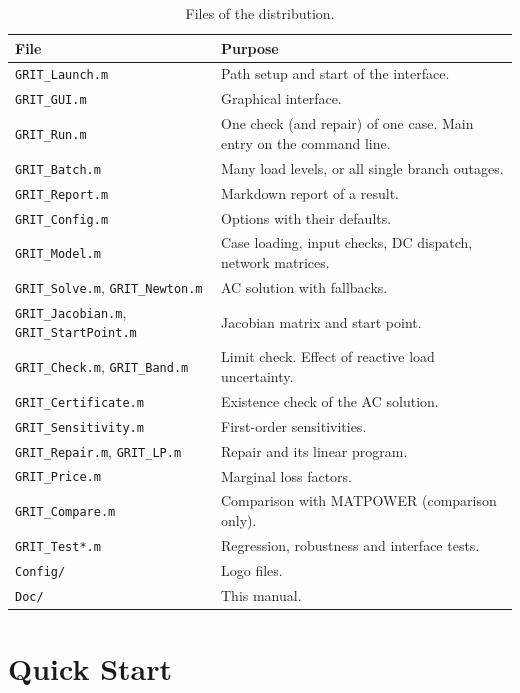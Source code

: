 \documentclass[a4paper,11pt]{article}
\begin{document}
\begin{table}[H]\centering\small
\begin{tabular}{@{}p{5.6cm}p{9.2cm}@{}}
\toprule
\textbf{File} & \textbf{Purpose} \\
\midrule
\texttt{GRIT\_Launch.m} & Path setup and start of the interface. \\
\texttt{GRIT\_GUI.m} & Graphical interface. \\
\texttt{GRIT\_Run.m} & One check (and repair) of one case. Main entry on the command line. \\
\texttt{GRIT\_Batch.m} & Many load levels, or all single branch outages. \\
\texttt{GRIT\_Report.m} & Markdown report of a result. \\
\texttt{GRIT\_Config.m} & Options with their defaults. \\
\texttt{GRIT\_Model.m} & Case loading, input checks, DC dispatch, network matrices. \\
\texttt{GRIT\_Solve.m}, \texttt{GRIT\_Newton.m} & AC solution with fallbacks. \\
\texttt{GRIT\_Jacobian.m}, \texttt{GRIT\_StartPoint.m} & Jacobian matrix and start point. \\
\texttt{GRIT\_Check.m}, \texttt{GRIT\_Band.m} & Limit check. Effect of reactive load uncertainty. \\
\texttt{GRIT\_Certificate.m} & Existence check of the AC solution. \\
\texttt{GRIT\_Sensitivity.m} & First-order sensitivities. \\
\texttt{GRIT\_Repair.m}, \texttt{GRIT\_LP.m} & Repair and its linear program. \\
\texttt{GRIT\_Price.m} & Marginal loss factors. \\
\texttt{GRIT\_Compare.m} & Comparison with MATPOWER (comparison only). \\
\texttt{GRIT\_Test*.m} & Regression, robustness and interface tests. \\
\texttt{Config/} & Logo files. \\
\texttt{Doc/} & This manual. \\
\bottomrule
\end{tabular}
\caption{Files of the distribution.}
\end{table}

\section{Quick Start}\label{sec:quick}
\end{document}

